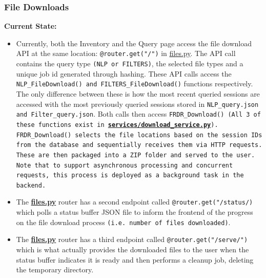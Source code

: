 \documentclass{article}
\begin{document}
\subsubsection{File Downloads}
\par{\textbf{Current State:}}
\begin{itemize}
\item{Currently, both the Inventory and the Query page access the file download API at the same location: \texttt{@router.get("/")} in \href{https://github.com/OCD-Rats-Capstone/OCD-Rat-Infrastructure/blob/main/src/ocd-rat-backend/routers/files.py}{files.py}.
The API call contains the query type \texttt{(NLP or FILTERS)}, the selected file types and a unique job id generated through hashing. These API calls access the \texttt{NLP\_FileDownload() and FILTERS\_FileDownload()} functions respectively.
The only difference between these is how the most recent queried sessions are accessed with the most previously queried sessions stored in \texttt{NLP\_query.json and Filter\_query.json}. Both calls then access  
\texttt{FRDR\_Download() (All 3 of these functions exist in \href{https://github.com/OCD-Rats-Capstone/OCD-Rat-Infrastructure/blob/main/src/ocd-rat-backend/services/download_service.py}{\textbf{services/download\_service.py}}). FRDR\_Download() selects the file locations
based on the session IDs from the database and sequentially receives them via HTTP requests. These are then packaged into a ZIP folder and served to the user. Note that to support asynchronous processing
and concurrent requests, this process is deployed as a background task in the backend.}}
\item{The \href{https://github.com/OCD-Rats-Capstone/OCD-Rat-Infrastructure/blob/main/src/ocd-rat-backend/routers/files.py}{\textbf{files.py}} router has a second endpoint called \texttt{@router.get("/status/)} which polls
a status buffer JSON file to inform the frontend of the progress on the file download process \texttt{(i.e. number of files downloaded)}.}
\item{The \href{https://github.com/OCD-Rats-Capstone/OCD-Rat-Infrastructure/blob/main/src/ocd-rat-backend/routers/files.py}{\textbf{files.py}} router has a third endpoint called \texttt{@router.get("/serve/")} which is what actually
provides the downloaded files to the user when the status buffer indicates it is ready and then performs a cleanup job, deleting the temporary directory.}
\end{itemize}
\end{document}
